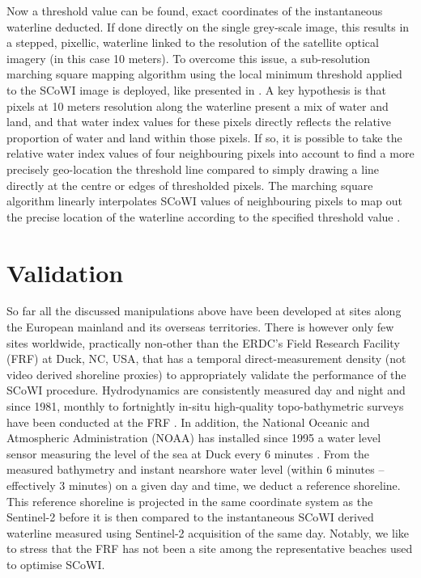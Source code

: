 \documentclass[remotesensing,article,submit,pdftex,moreauthors]{Definitions/mdpi}
\begin{document}
Now a threshold value can be found, exact coordinates of the instantaneous waterline deducted. If done directly on the single grey-scale image, this results in a stepped, pixellic, waterline linked to the resolution of the satellite optical imagery (in this case 10 meters). To overcome this issue, a sub-resolution marching square mapping algorithm using the local minimum threshold applied to the SCoWI image is deployed, like presented in \citet{VOS2019_sub}. A key hypothesis is that pixels at 10 meters resolution along the waterline present a mix of water and land, and that water index values for these pixels directly reflects the relative proportion of water and land within those pixels. If so, it is possible to take the relative water index values of four neighbouring pixels into account to find a more precisely geo-location the threshold line compared to simply drawing a line directly at the centre or edges of thresholded pixels. The marching square algorithm linearly interpolates SCoWI values of neighbouring pixels to map out the precise location of the waterline according to the specified threshold value \citep{CIPOLLETTI201287}.

\section{Validation}
So far all the discussed manipulations above have been developed at sites along the European mainland and its overseas territories. There is however only few sites worldwide, practically non-other than the ERDC's Field Research Facility (FRF) at Duck, NC, USA, that has a temporal direct-measurement density (not video derived shoreline proxies) to appropriately validate the performance of the SCoWI procedure. Hydrodynamics are consistently measured day and night and since 1981, monthly to fortnightly in-situ high-quality topo-bathymetric surveys have been conducted at the FRF \citep{FORTE2017}. In addition, the National Oceanic and Atmospheric Administration (NOAA) has installed since 1995 a water level sensor measuring the level of the sea at Duck every 6 minutes \citep{park2014water}. From the measured bathymetry and instant nearshore water level (within 6 minutes -- effectively 3 minutes) on a given day and time, we deduct a reference shoreline. This reference shoreline is projected in the same coordinate system as the Sentinel-2 before it is then compared to the instantaneous SCoWI derived waterline measured using Sentinel-2 acquisition of the same day. Notably, we like to stress that the FRF has not been a site among the representative beaches used to optimise SCoWI.
\end{document}
